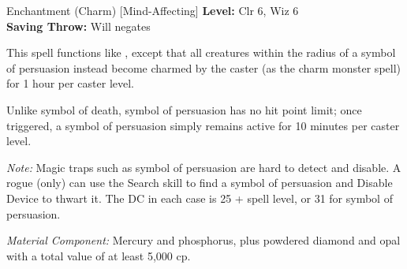 {Enchantment (Charm) [Mind-Affecting]}
{
	\textbf{Level:}
	Clr 6, Wiz 6\\
	\textbf{Saving Throw:}
	Will negates\\
}
{
	This spell functions like , except that all creatures within the radius of a symbol of persuasion instead become charmed by the caster (as the charm monster spell) for 1 hour per caster level.

	Unlike symbol of death, symbol of persuasion has no hit point limit; once triggered, a symbol of persuasion simply remains active for 10 minutes per caster level.

	\textit{Note:} Magic traps such as symbol of persuasion are hard to detect and disable. A rogue (only) can use the Search skill to find a symbol of persuasion and Disable Device to thwart it. The DC in each case is 25 + spell level, or 31 for symbol of persuasion.

	\textit{Material Component:}
	Mercury and phosphorus, plus powdered diamond and opal with a total value of at least 5,000 cp.

}
